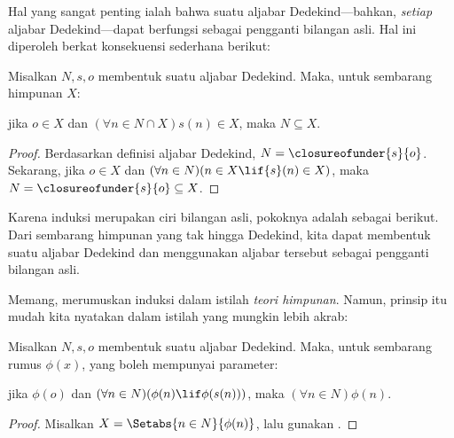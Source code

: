 \documentclass[../../../include/open-logic-section]{subfiles}
\begin{document}

Hal yang sangat penting ialah bahwa suatu aljabar Dedekind---bahkan,
\emph{setiap} aljabar Dedekind---dapat berfungsi sebagai pengganti bilangan
asli. Hal ini diperoleh berkat konsekuensi sederhana berikut:

\begin{thm}
Misalkan $N, s, o$ membentuk suatu aljabar Dedekind. Maka, untuk sembarang
himpunan $X$:
	\begin{center}
		jika $o \in X$ dan $(\forall {n} \in N \cap X){s}({n}) \in X$, {maka} $N \subseteq X$.
	\end{center}
\end{thm}

\begin{proof}
Berdasarkan definisi aljabar Dedekind, $N = \closureofunder{s}{o}$.
Sekarang, jika ${o} \in X$ dan $(\forall {n} \in N)(n \in X \lif
{s}({n}) \in X)$, maka $N = \closureofunder{s}{o} \subseteq X$.
\end{proof}

Karena induksi merupakan ciri bilangan asli, pokoknya adalah sebagai berikut.
Dari sembarang himpunan yang tak hingga Dedekind, kita dapat membentuk suatu
aljabar Dedekind dan menggunakan aljabar tersebut sebagai pengganti bilangan
asli.

Memang,  merumuskan induksi dalam istilah
\emph{teori himpunan}. Namun, prinsip itu mudah kita nyatakan dalam istilah
yang mungkin lebih akrab:

\begin{cor}
Misalkan $N, s, o$ membentuk suatu aljabar Dedekind. Maka, untuk sembarang
rumus $\phi(x)$, yang boleh mempunyai parameter:
\begin{center}
	jika $\phi(o)$ dan $(\forall {n} \in N)(\phi(n)\lif
	\phi({s}({n})))$, {maka} $(\forall n \in N)\phi(n)$.
\end{center}
\end{cor}

\begin{proof}
Misalkan $X = \Setabs{n \in N}{\phi(n)}$, lalu gunakan
.
\end{proof}
\end{document}

